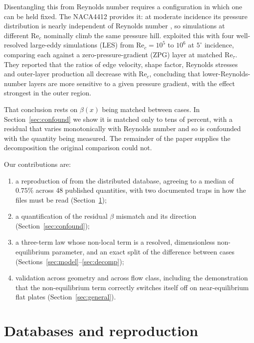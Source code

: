\documentclass[11pt,a4paper]{article}
\newcommand{\Rec}{\mathrm{Re}_c}
\newcommand{\Ret}{\mathrm{Re}_\tau}
\begin{document}
Disentangling this from Reynolds number requires a configuration in which
one can be held fixed. The NACA4412 provides it: at moderate incidence its
pressure distribution is nearly independent of Reynolds number
\citep{pinkerton1938}, so simulations at different $\Rec$ nominally climb
the same pressure hill. \citet{vinuesa2018} exploited this with four
well-resolved large-eddy simulations (LES) from $\Rec = 10^5$ to $10^6$ at
$5^\circ$ incidence, comparing each against a zero-pressure-gradient (ZPG)
layer at matched $\Ret$. They reported that the ratios of edge velocity,
shape factor, Reynolds stresses and outer-layer production all decrease with
$\Rec$, concluding that lower-Reynolds-number layers are more sensitive to a
given pressure gradient, with the effect strongest in the outer region.

That conclusion rests on $\beta(x)$ being matched between cases. In
Section~\ref{sec:confound} we show it is matched only to tens of percent,
with a residual that varies monotonically with Reynolds number and so is
confounded with the quantity being measured. The remainder of the paper
supplies the decomposition the original comparison could not.

Our contributions are:
\begin{enumerate}
  \item a reproduction of \citet{vinuesa2018} from the distributed database,
        agreeing to a median of $0.75\%$ across 48 published quantities, with
        two documented traps in how the files must be read
        (Section~\ref{sec:data});
  \item a quantification of the residual $\beta$ mismatch and its direction
        (Section~\ref{sec:confound});
  \item a three-term law whose non-local term is a resolved, dimensionless
        non-equilibrium parameter, and an exact split of the difference
        between cases (Sections~\ref{sec:model}--\ref{sec:decomp});
  \item validation across geometry and across flow class, including the
        demonstration that the non-equilibrium term correctly switches itself
        off on near-equilibrium flat plates (Section~\ref{sec:general}).
\end{enumerate}

\section{Databases and reproduction}
\label{sec:data}
\end{document}
